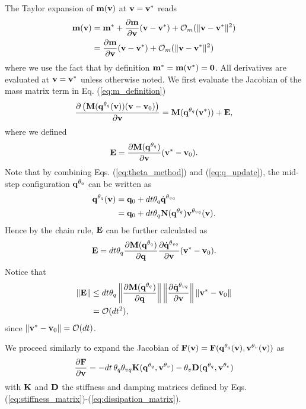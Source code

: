 The Taylor expansion of ${\mathbf{m}}({\mathbf{v}})$ at ${\mathbf{v}}={\mathbf{v}}^*$ reads
\begin{align}
	\mf{m}(\mf{v}) &= \mf{m}^* + \frac{\partial \mf{m}}{\partial \mf{v}} (\mf{v}-\mf{v}^*) +
	\mathcal{O}_m(\Vert\mf{v}-\mf{v}^*\Vert^2)\nonumber\\
	&=\frac{\partial \mf{m}}{\partial \mf{v}}(\mf{v}-\mf{v}^*) +
	\mathcal{O}_m(\Vert\mf{v}-\mf{v}^*\Vert^2)
	\label{eq:m_taylor_expansion}
\end{align}
where we use the fact that by definition ${\mathbf{m}}^*={\mathbf{m}}({\mathbf{v}}^*)={\mathbf{0}}$. All
derivatives are evaluated at ${\mathbf{v}} = {\mathbf{v}}^*$ unless otherwise noted. We
first evaluate the Jacobian of the mass matrix term in Eq.
(\ref{eq:m_definition})
\begin{align*}
	\frac{\partial \left( {\mathbf{M}}({\mathbf{q}}^{\theta_{q}}({\mathbf{v}}))({\mathbf{v}}-{\mathbf{v}}_0) \right)}{\partial {\mathbf{v}}}
	= {\mathbf{M}}({\mathbf{q}}^{\theta_{q}}({\mathbf{v}}^*)) + {\mathbf{E}},
\end{align*}
where we defined
\begin{align*}
	{\mathbf{E}} = \frac{\partial {\mathbf{M}}({\mathbf{q}}^{\theta_{q}})}{\partial{\mathbf{v}}} ({\mathbf{v}}^*-{\mathbf{v}}_0).
\end{align*}
Note that by combining Eqs. (\ref{eq:theta_method}) and (\ref{eq:q_update}), the
mid-step configuration ${\mathbf{q}}^{\theta_q}$ can be written as
\begin{align*}
	{\mathbf{q}}^{\theta_q}({\mathbf{v}}) &= {\mathbf{q}}_0 + dt \theta_q \dot{{\mathbf{q}}}^{\theta_{vq}} \\
	                          &= {\mathbf{q}}_0 + dt \theta_q {\mathbf{N}}({\mathbf{q}}^{\theta_{q}}){\mathbf{v}}^{\theta_{vq}}({\mathbf{v}}).
\end{align*}
Hence by the chain rule, ${\mathbf{E}}$ can be further calculated as
\begin{align*}
	{\mathbf{E}} = dt\theta_q\frac{\partial {\mathbf{M}}({\mathbf{q}}^{\theta_{q}}) }{\partial{\mathbf{q}}}
             \frac{\partial\dot{{\mathbf{q}}}^{\theta_{vq}}}{\partial{\mathbf{v}}}
			 ({\mathbf{v}}^*-{\mathbf{v}}_0).
\end{align*}
Notice that 
\begin{align*}
		\Vert{\mathbf{E}}\Vert 
		&\le dt\theta_q \left\| \frac{\partial{\mathbf{M}}({\mathbf{q}}^{\theta_{q}})}{\partial{\mathbf{q}}}  \right\|
			\left\| \frac{\partial\dot{{\mathbf{q}}}^{\theta_{vq}}}{\partial{\mathbf{v}}}  \right\|
		    \left\| {\mathbf{v}}^*-{\mathbf{v}}_0 \right\| \\
		&= \mathcal{O}(dt^2),
\end{align*}
since $\Vert{\mathbf{v}}^*-{\mathbf{v}}_0\Vert = \mathcal{O}(dt)$.

We proceed similarly to expand the Jacobian of
${\mathbf{F}}({\mathbf{v}})={\mathbf{F}}({\mathbf{q}}^{\theta_{q}}({\mathbf{v}}), {\mathbf{v}}^{\theta_v}({\mathbf{v}}))$
as
\begin{align*}
	\frac{\partial{\mathbf{F}}}{\partial {\mathbf{v}}} = -dt\,\theta_q\theta_{vq}{\mathbf{K}}({\mathbf{q}}^{\theta_q},
	{\mathbf{v}}^{\theta_v})-\theta_v{\mathbf{D}}({\mathbf{q}}^{\theta_q}, {\mathbf{v}}^{\theta_v})
\end{align*}
with ${\mathbf{K}}$ and ${\mathbf{D}}$ the stiffness and damping matrices defined by Eqs.
(\ref{eq:stiffness_matrix})-(\ref{eq:dissipation_matrix}).

